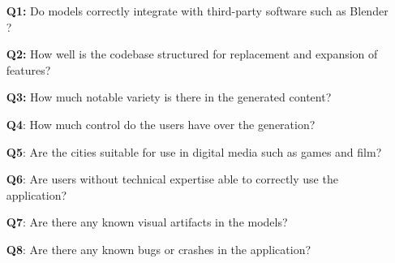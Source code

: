 \vspace{-0.5cm} %
\begin{itemize}
  \item[\textbf{Q1:}] Do models correctly integrate with third-party software such as Blender \cite{blender}?
  \item[\textbf{Q2:}] How well is the codebase structured for replacement and expansion of features?
  \item[\textbf{Q3:}] How much notable variety is there in the generated content?
  \item[\textbf{Q4}:] How much control do the users have over the generation?
  \item[\textbf{Q5}:] Are the cities suitable for use in digital media such as games and film?
  \item[\textbf{Q6}:] Are users without technical expertise able to correctly use the application?
  \item[\textbf{Q7}:] Are there any known visual artifacts in the models?
  \item[\textbf{Q8}:] Are there any known bugs or crashes in the application?
\end{itemize}